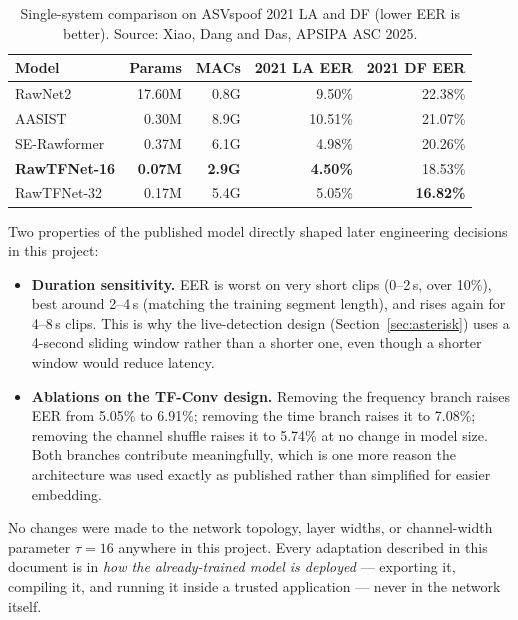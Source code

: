 \documentclass[11pt,a4paper]{report}
\begin{document}
\begin{table}[H]
\centering
\small
\begin{tabular}{lrrrr}
\toprule
Model & Params & MACs & 2021 LA EER & 2021 DF EER \\
\midrule
RawNet2       & 17.60M & 0.8G & 9.50\%  & 22.38\% \\
AASIST        & 0.30M  & 8.9G & 10.51\% & 21.07\% \\
SE-Rawformer  & 0.37M  & 6.1G & 4.98\%  & 20.26\% \\
\textbf{RawTFNet-16} & \textbf{0.07M} & \textbf{2.9G} & \textbf{4.50\%} & 18.53\% \\
RawTFNet-32   & 0.17M  & 5.4G & 5.05\%  & \textbf{16.82\%} \\
\bottomrule
\end{tabular}
\caption{Single-system comparison on ASVspoof 2021 LA and DF (lower EER is better). Source: Xiao,
Dang and Das, APSIPA ASC 2025.}
\label{tab:rawtfnet-compare}
\end{table}

Two properties of the published model directly shaped later engineering decisions in this project:

\begin{itemize}[leftmargin=1.4em]
  \item \textbf{Duration sensitivity.} EER is worst on very short clips (0--2\,s, over 10\%), best
  around 2--4\,s (matching the training segment length), and rises again for 4--8\,s clips. This is
  why the live-detection design (Section~\ref{sec:asterisk}) uses a 4-second sliding window rather
  than a shorter one, even though a shorter window would reduce latency.
  \item \textbf{Ablations on the TF-Conv design.} Removing the frequency branch raises EER from
  5.05\% to 6.91\%; removing the time branch raises it to 7.08\%; removing the channel shuffle
  raises it to 5.74\% at no change in model size. Both branches contribute meaningfully, which is
  one more reason the architecture was used exactly as published rather than simplified for
  easier embedding.
\end{itemize}

No changes were made to the network topology, layer widths, or channel-width parameter
$\tau=16$ anywhere in this project. Every adaptation described in this document is in \emph{how
the already-trained model is deployed} --- exporting it, compiling it, and running it inside a
trusted application --- never in the network itself.
\end{document}
